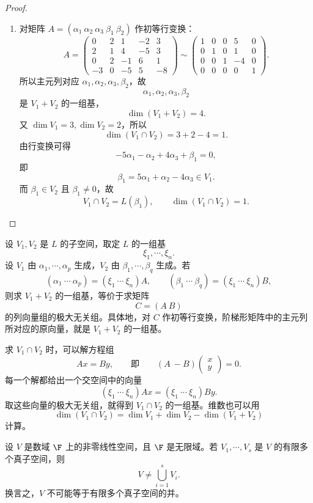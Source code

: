 \begin{proof}
\begin{enumerate}
		\item 对矩阵 $A=(\alpha_1\ \alpha_2\ \alpha_3\ \beta_1\ \beta_2)$ 作初等行变换：
		\[
		A=
		\begin{pmatrix}
			0&2&1&-2&3\\
			2&1&4&-5&3\\
			0&2&-1&6&1\\
			-3&0&-5&5&-8
		\end{pmatrix}
		\sim
		\begin{pmatrix}
			1&0&0&5&0\\
			0&1&0&1&0\\
			0&0&1&-4&0\\
			0&0&0&0&1
		\end{pmatrix}.
		\]
		所以主元列对应 $\alpha_1,\alpha_2,\alpha_3,\beta_2$，故
		\[
		\alpha_1,\alpha_2,\alpha_3,\beta_2
		\]
		是 $V_1+V_2$ 的一组基，
		\[
		\dim(V_1+V_2)=4.
		\]
		又 $\dim V_1=3,\dim V_2=2$，所以
		\[
		\dim(V_1\cap V_2)=3+2-4=1.
		\]
		由行变换可得
		\[
		-5\alpha_1-\alpha_2+4\alpha_3+\beta_1=0,
		\]
		即
		\[
		\beta_1=5\alpha_1+\alpha_2-4\alpha_3\in V_1.
		\]
		而 $\beta_1\in V_2$ 且 $\beta_1\neq0$，故
		\[
		V_1\cap V_2=L(\beta_1),
		\qquad
		\dim(V_1\cap V_2)=1.
		\]
	\end{enumerate}
\end{proof}

\begin{algo}[求子空间的和与交]
	设 $V_1,V_2$ 是 $L$ 的子空间，取定 $L$ 的一组基
	\[
	\xi_1,\cdots,\xi_n.
	\]
	设 $V_1$ 由 $\alpha_1,\cdots,\alpha_p$ 生成，$V_2$ 由 $\beta_1,\cdots,\beta_q$ 生成。若
	\[
	(\alpha_1\ \cdots\ \alpha_p)=(\xi_1\ \cdots\ \xi_n)A,
	\qquad
	(\beta_1\ \cdots\ \beta_q)=(\xi_1\ \cdots\ \xi_n)B,
	\]
	则求 $V_1+V_2$ 的一组基，等价于求矩阵
	\[
	C=(A\ B)
	\]
	的列向量组的极大无关组。具体地，对 $C$ 作初等行变换，阶梯形矩阵中的主元列所对应的原向量，就是 $V_1+V_2$ 的一组基。
	
	求 $V_1\cap V_2$ 时，可以解方程组
	\[
	Ax=By,
	\qquad \text{即}\qquad
	(A\ -B)
	\begin{pmatrix}
		x\\y
	\end{pmatrix}=0.
	\]
	每一个解都给出一个交空间中的向量
	\[
	(\xi_1\ \cdots\ \xi_n)Ax=(\xi_1\ \cdots\ \xi_n)By.
	\]
	取这些向量的极大无关组，就得到 $V_1\cap V_2$ 的一组基。维数也可以用
	\[
	\dim(V_1\cap V_2)=\dim V_1+\dim V_2-\dim(V_1+V_2)
	\]
	计算。
\end{algo}

\begin{theorem}
	设 $V$ 是数域 $\F$ 上的非零线性空间，且 $\F$ 是无限域。若 $V_1,\cdots,V_s$ 是 $V$ 的有限多个真子空间，则
	\[
	V\neq\bigcup_{i=1}^{s}V_i.
	\]
	换言之，$V$ 不可能等于有限多个真子空间的并。
\end{theorem}

